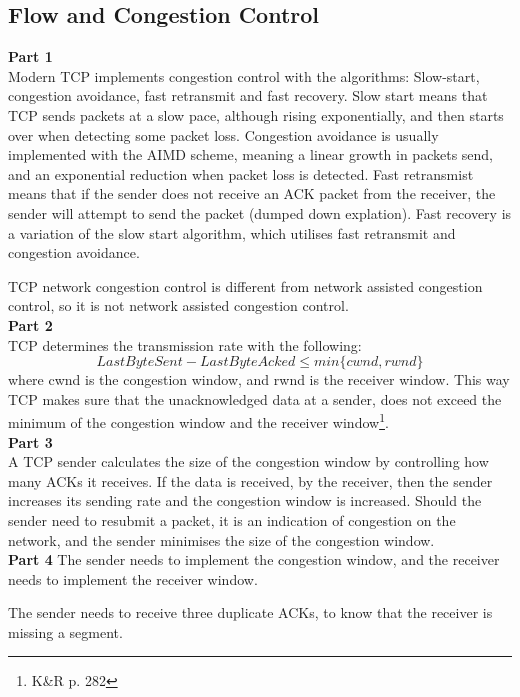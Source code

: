 \subsection{Flow and Congestion Control}
\textbf{Part 1}\\
Modern TCP implements congestion control with the algorithms:
Slow-start, congestion avoidance, fast retransmit and fast
recovery. Slow start means that TCP sends packets at a slow pace,
although rising exponentially, and then starts over when detecting
some packet loss. Congestion avoidance is usually implemented with the
AIMD scheme, meaning a linear growth in packets send, and an
exponential reduction when packet loss is detected. Fast retransmist
means that if the sender does not receive an ACK packet from the
receiver, the sender will attempt to send the packet (dumped down
explation). Fast recovery is a variation of the slow start algorithm,
which utilises fast retransmit and congestion avoidance.

TCP network congestion control is different from network assisted congestion
control, so it is not network assisted congestion control.\\

\noindent \textbf{Part 2}\\
TCP determines the transmission rate with the following:
\[
LastByteSent - LastByteAcked \leq min\{cwnd, rwnd\}
\]
where cwnd is the congestion window, and rwnd is the receiver
window. This way TCP makes sure that the unacknowledged data at a
sender, does not exceed the minimum of the congestion window and the
receiver window\footnote{K\&R p. 282}.\\

\noindent \textbf{Part 3}\\
A TCP sender calculates the size of the congestion window by
controlling how many ACKs it receives. If the data is received, by the
receiver, then the sender increases its sending rate and the
congestion window is increased. Should the sender need to resubmit a
packet, it is an indication of congestion on the network, and the
sender minimises the size of the congestion window.\\

\noindent \textbf{Part 4}
The sender needs to implement the congestion window, and the receiver
needs to implement the receiver window.

The sender needs to receive three duplicate ACKs, to know that the
receiver is missing a segment.